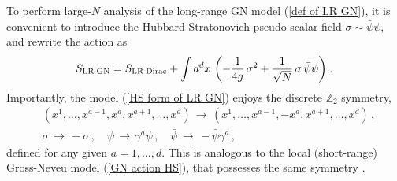 \documentclass[aps,amsmath,amssymb,prd,showpacs,floatfix,preprint,superscriptaddress,nofootinbib,12pt]{article}
\begin{document}
To perform large-$N$ analysis of the long-range GN model (\ref{def of LR GN}),
it is convenient to introduce the Hubbard-Stratonovich pseudo-scalar field $\sigma\sim\bar\psi\psi$,
and rewrite the action as
\begin{equation}
\label{HS form of LR GN}
S_{\textrm{LR\;GN}} = S_{\textrm{LR\;Dirac}} +
\int d^dx \,\left(-\frac{1}{4g}\,\sigma^2+\frac{1}{\sqrt{N}}\,\sigma\,\bar\psi\psi\right)\,.
\end{equation}
Importantly, the model (\ref{HS form of LR GN}) enjoys the discrete $\mathbb{Z}_2$ symmetry,
\begin{equation}
\label{Z2 sym of LR GN}
\begin{aligned}
&(x^1,\dots,x^{a-1},x^a,x^{a+1},\dots,x^d)\,\rightarrow\, (x^1,\dots,x^{a-1},-x^a,x^{a+1},\dots,x^d)\,,\\
&\sigma\,\rightarrow\,-\sigma\,,\quad\psi\,\rightarrow\, \gamma^a\psi\,,\quad
\bar\psi\,\rightarrow\,-\bar\psi\gamma^a\,,
\end{aligned}
\end{equation}
defined for any given $a=1,\dots,d$. This is analogous to the local (short-range)
Gross-Neveu model (\ref{GN action HS}), that possesses the same symmetry
\cite{Gross:1974jv,Zinn-Justin:1991ksq,Moshe:2003xn}.
\end{document}
